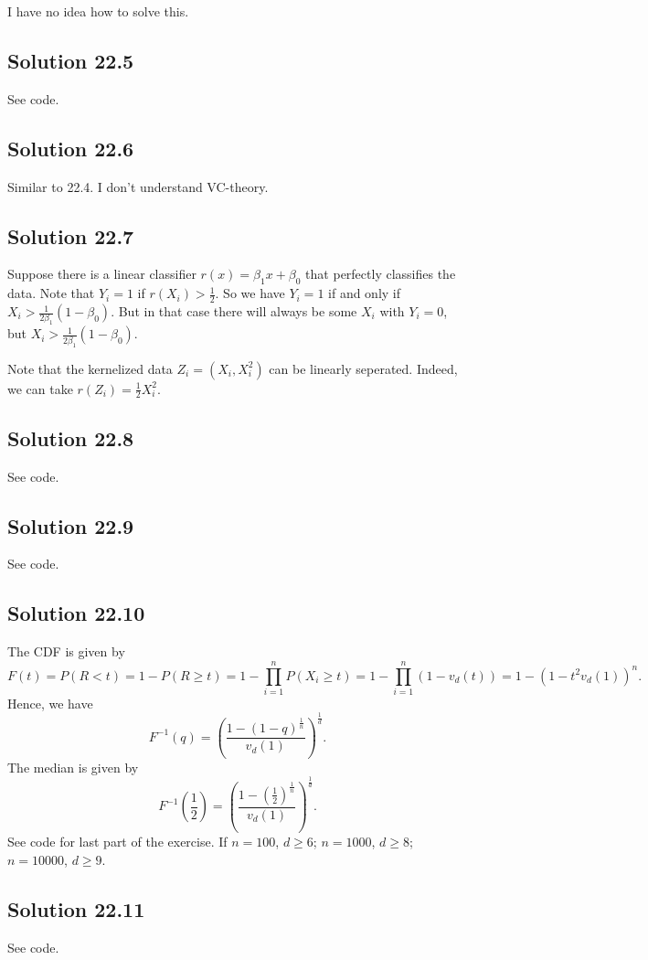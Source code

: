 I have no idea how to solve this.


\subsection*{Solution 22.5}

See code.


\subsection*{Solution 22.6}

Similar to 22.4. I don't understand VC-theory.


\subsection*{Solution 22.7}

Suppose there is a linear classifier $r(x) = \beta_1 x + \beta_0$ that perfectly classifies the data.
Note that $Y_i = 1$ if $r(X_i) > \frac{1}{2}$.
So we have $Y_i = 1$ if and only if $X_i > \frac{1}{2 \beta_1} (1 - \beta_0)$.
But in that case there will always be some $X_i$ with $Y_i = 0$, but $X_i > \frac{1}{2 \beta_1} (1 - \beta_0)$.

Note that the kernelized data $Z_i = (X_i, X_i^2)$ can be linearly seperated.
Indeed, we can take $r(Z_i) = \frac{1}{2} X_i^2$.


\subsection*{Solution 22.8}

See code.


\subsection*{Solution 22.9}

See code.


\subsection*{Solution 22.10}

The CDF is given by
\begin{equation*}
    F(t) = P(R < t)
        = 1 - P(R \geq t)
        = 1 - \prod_{i = 1}^n P(X_i \geq t)
        = 1 - \prod_{i = 1}^n (1 - v_d(t))
        = 1 - (1 - t^2 v_d(1))^n.
\end{equation*}
Hence, we have
\begin{equation*}
    F^{-1}(q) = \left(\frac{1 - (1 - q)^{\frac{1}{n}}}{v_d(1)}\right)^{\frac{1}{d}}.
\end{equation*}
The median is given by
\begin{equation*}
    F^{-1}\left(\frac{1}{2}\right) = \left(\frac{1 - (\frac{1}{2})^{\frac{1}{n}}}{v_d(1)}\right)^{\frac{1}{d}}.
\end{equation*}
See code for last part of the exercise.
If $n = 100$, $d \geq 6$; $n = 1000$, $d \geq 8$; $n = 10000$, $d \geq 9$.


\subsection*{Solution 22.11}

See code.
